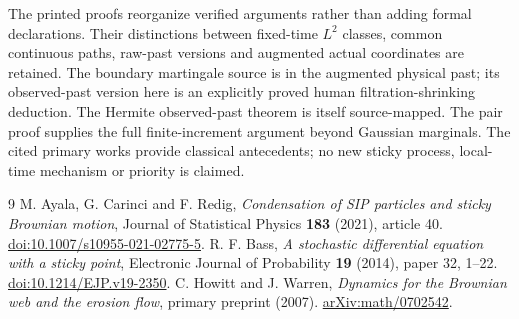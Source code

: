 \documentclass[11pt]{article}
\begin{document}
The printed proofs reorganize verified arguments rather than adding
formal declarations. Their distinctions between fixed-time $L^2$
classes, common continuous paths, raw-past versions and augmented
actual coordinates are retained. The boundary martingale source is in the augmented physical past;
its observed-past version here is an explicitly proved human
filtration-shrinking deduction. The Hermite observed-past theorem
is itself source-mapped. The pair proof supplies the full
finite-increment argument beyond Gaussian marginals. The cited
primary works provide classical antecedents; no new sticky process,
local-time mechanism or priority is claimed.

\begin{thebibliography}{9}
 M. Ayala, G. Carinci and F. Redig,
\emph{Condensation of SIP particles and sticky Brownian motion},
Journal of Statistical Physics \textbf{183} (2021), article 40.
\href{https://doi.org/10.1007/s10955-021-02775-5}
{doi:10.1007/s10955-021-02775-5}.
 R. F. Bass,
\emph{A stochastic differential equation with a sticky point},
Electronic Journal of Probability \textbf{19} (2014), paper 32, 1--22.
\href{https://doi.org/10.1214/EJP.v19-2350}{doi:10.1214/EJP.v19-2350}.
 C. Howitt and J. Warren,
\emph{Dynamics for the Brownian web and the erosion flow},
primary preprint (2007).
\href{https://arxiv.org/abs/math/0702542}{arXiv:math/0702542}.
\end{thebibliography}
\end{document}
